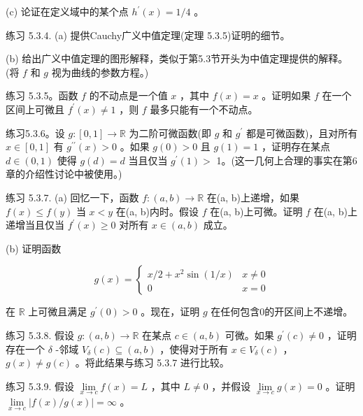 (c) 论证在定义域中的某个点 \({h}^{\prime }\left( x\right)  = 1/4\) 。

练习 5.3.4. (a) 提供Cauchy广义中值定理(定理 5.3.5)证明的细节。

(b) 给出广义中值定理的图形解释，类似于第5.3节开头为中值定理提供的解释。(将 \(f\) 和 \(g\) 视为曲线的参数方程。)

练习 5.3.5。函数 \(f\) 的不动点是一个值 \(x\) ，其中 \(f\left( x\right)  = x\) 。证明如果 \(f\) 在一个区间上可微且 \({f}^{\prime }\left( x\right)  \neq  1\) ，则 \(f\) 最多只能有一个不动点。

练习5.3.6。设 \(g : \left\lbrack  {0,1}\right\rbrack   \rightarrow  \mathbb{R}\) 为二阶可微函数(即 \(g\) 和 \({g}^{\prime }\) 都是可微函数)，且对所有 \(x \in  \left\lbrack  {0,1}\right\rbrack\) 有 \({g}^{\prime \prime }\left( x\right)  > 0\) 。如果 \(g\left( 0\right)  > 0\) 且 \(g\left( 1\right)  = 1\) ，证明存在某点 \(d \in  \left( {0,1}\right)\) 使得 \(g\left( d\right)  = d\) 当且仅当 \({g}^{\prime }\left( 1\right)  >\) 1。(这一几何上合理的事实在第6章的介绍性讨论中被使用。)

练习 5.3.7. (a) 回忆一下，函数 \(f : \left( {a,b}\right)  \rightarrow  \mathbb{R}\) 在(a, b)上递增，如果 \(f\left( x\right)  \leq  f\left( y\right)\) 当 \(x < y\) 在(a, b)内时。假设 \(f\) 在(a, b)上可微。证明 \(f\) 在(a, b)上递增当且仅当 \({f}^{\prime }\left( x\right)  \geq  0\) 对所有 \(x \in  \left( {a,b}\right)\) 成立。

(b) 证明函数

\[
g\left( x\right)  = \left\{  \begin{array}{ll} x/2 + {x}^{2}\sin \left( {1/x}\right) & x \neq  0 \\  0 & x = 0 \end{array}\right.
\]

在 \(\mathbb{R}\) 上可微且满足 \({g}^{\prime }\left( 0\right)  > 0\) 。现在，证明 \(g\) 在任何包含0的开区间上不递增。

练习 5.3.8. 假设 \(g : \left( {a,b}\right)  \rightarrow  \mathbb{R}\) 在某点 \(c \in  \left( {a,b}\right)\) 可微。如果 \({g}^{\prime }\left( c\right)  \neq  0\) ，证明存在一个 \(\delta\) -邻域 \({V}_{\delta }\left( c\right)  \subseteq  \left( {a,b}\right)\) ，使得对于所有 \(x \in  {V}_{\delta }\left( c\right)\) ， \(g\left( x\right)  \neq  g\left( c\right)\) 。将此结果与练习 5.3.7 进行比较。

练习 5.3.9. 假设 \(\mathop{\lim }\limits_{{x \rightarrow  c}}f\left( x\right)  = L\) ，其中 \(L \neq  0\) ，并假设 \(\mathop{\lim }\limits_{{x \rightarrow  c}}g\left( x\right)  = 0\) 。证明 \(\mathop{\lim }\limits_{{x \rightarrow  c}}\left| {f\left( x\right) /g\left( x\right) }\right|  = \infty\) 。

